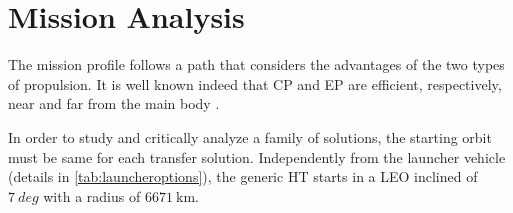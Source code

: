 
\section{Mission Analysis}
\label{sec:missionalaysis}

The mission profile follows a path that considers the advantages of the two types of propulsion. It is well known indeed that CP and EP are efficient, respectively, near and far from the main body \cite{wertz2011space,tesisimo}.

In order to study and critically analyze a family of solutions, the starting orbit must be same for each transfer solution. Independently from the launcher vehicle (details in \tablename\ref{tab:launcheroptions}), the generic HT starts in a LEO inclined of $7~\si{deg}$ with a radius of $6671~\si{\kilo\meter}$.
%
%
%
%
%
%
